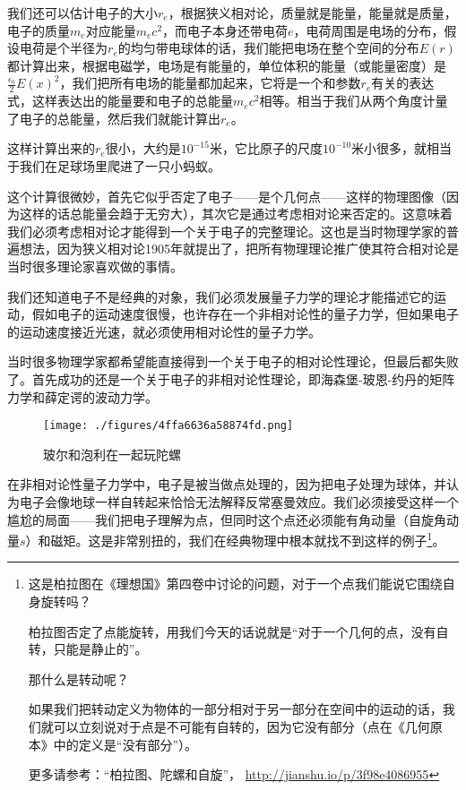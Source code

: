 我们还可以估计电子的大小$r_e$，根据狭义相对论，质量就是能量，能量就是质量，电子的质量$m_e$对应能量$m_e c^2$，而电子本身还带电荷$e$，电荷周围是电场的分布，假设电荷是个半径为$r_e$的均匀带电球体的话，我们能把电场在整个空间的分布$E(r) $都计算出来，根据电磁学，电场是有能量的，单位体积的能量（或能量密度）是$ \frac{\epsilon_0}{2} E(x)^2$，我们把所有电场的能量都加起来，它将是一个和参数$r_e$有关的表达式，这样表达出的能量要和电子的总能量$m_e c^2$相等。相当于我们从两个角度计量了电子的总能量，然后我们就能计算出$r_e$。

这样计算出来的$r_e$很小，大约是$10^{-15}$米，它比原子的尺度$10^{-10}$米小很多，就相当于我们在足球场里爬进了一只小蚂蚁。

这个计算很微妙，首先它似乎否定了电子——是个几何点——这样的物理图像（因为这样的话总能量会趋于无穷大），其次它是通过考虑相对论来否定的。这意味着我们必须考虑相对论才能得到一个关于电子的完整理论。这也是当时物理学家的普遍想法，因为狭义相对论1905年就提出了，把所有物理理论推广使其符合相对论是当时很多理论家喜欢做的事情。

我们还知道电子不是经典的对象，我们必须发展量子力学的理论才能描述它的运动，假如电子的运动速度很慢，也许存在一个非相对论性的量子力学，但如果电子的运动速度接近光速，就必须使用相对论性的量子力学。

当时很多物理学家都希望能直接得到一个关于电子的相对论性理论，但最后都失败了。首先成功的还是一个关于电子的非相对论性理论，即海森堡-玻恩-约丹的矩阵力学和薛定谔的波动力学。

\begin{figure}[ht]
\centering
\texttt{[image: ./figures/4ffa6636a58874fd.png]}
\caption{玻尔和泡利在⼀起玩陀螺} \label{fig_QMPre2_11}
\end{figure}

在非相对论性量子力学中，电子是被当做点处理的，因为把电子处理为球体，并认为电子会像地球一样自转起来恰恰无法解释反常塞曼效应。我们必须接受这样一个尴尬的局面——我们把电子理解为点，但同时这个点还必须能有角动量（自旋角动量$s$）和磁矩。这是非常别扭的，我们在经典物理中根本就找不到这样的例子\footnote{这是柏拉图在《理想国》第四卷中讨论的问题，对于一个点我们能说它围绕自身旋转吗？

柏拉图否定了点能旋转，用我们今天的话说就是“对于一个几何的点，没有自转，只能是静止的”。

那什么是转动呢？

如果我们把转动定义为物体的一部分相对于另一部分在空间中的运动的话，我们就可以立刻说对于点是不可能有自转的，因为它没有部分（点在《几何原本》中的定义是“没有部分”）。

更多请参考：“柏拉图、陀螺和自旋”， \url{http://jianshu.io/p/3f98e4086955} }。

